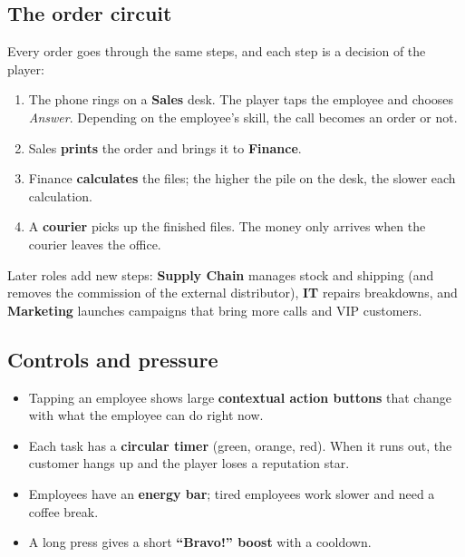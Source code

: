\documentclass[a4paper,11pt]{article}
\begin{document}
\subsection{The order circuit}
Every order goes through the same steps, and each step is a decision of the player:
\begin{enumerate}
  \item The phone rings on a \textbf{Sales} desk. The player taps the employee and chooses \emph{Answer}. Depending on the employee's skill, the call becomes an order or not.
  \item Sales \textbf{prints} the order and brings it to \textbf{Finance}.
  \item Finance \textbf{calculates} the files; the higher the pile on the desk, the slower each calculation.
  \item A \textbf{courier} picks up the finished files. The money only arrives when the courier leaves the office.
\end{enumerate}
Later roles add new steps: \textbf{Supply Chain} manages stock and shipping (and removes the commission of the external distributor), \textbf{IT} repairs breakdowns, and \textbf{Marketing} launches campaigns that bring more calls and VIP customers.

\subsection{Controls and pressure}
\begin{itemize}
  \item Tapping an employee shows large \textbf{contextual action buttons} that change with what the employee can do right now.
  \item Each task has a \textbf{circular timer} (green, orange, red). When it runs out, the customer hangs up and the player loses a reputation star.
  \item Employees have an \textbf{energy bar}; tired employees work slower and need a coffee break.
  \item A long press gives a short \textbf{``Bravo!'' boost} with a cooldown.
\end{itemize}
\end{document}
